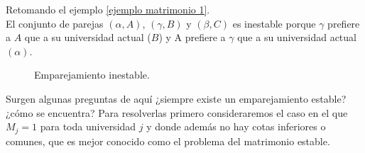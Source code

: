 \begin{eje}
Retomando el ejemplo \ref{ejemplo matrimonio 1}. \\
El conjunto de parejas $(\alpha, A)$, $(\gamma, B)$ y $(\beta, C)$ es inestable porque $\gamma$ prefiere a $A$ que a su universidad actual ($B$) y A prefiere a $\gamma$ que a su universidad actual $(\alpha)$.

\begin{figure}[H]\centering


\caption{Emparejamiento inestable.}
\end{figure}
\fin
\end{eje}


Surgen algunas preguntas de aquí ¿siempre existe un emparejamiento estable? ¿cómo se encuentra? Para resolverlas primero consideraremos el caso en el que $M_j=1$ para toda universidad $j$ y donde además no hay cotas inferiores o comunes, que es mejor conocido como el problema del matrimonio estable. 



